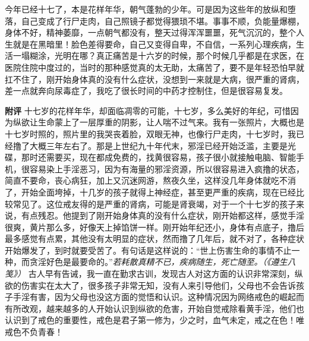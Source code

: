 \begin{case}
    今年已经十七了，本是花样年华，朝气蓬勃的少年。可是因为这些年的放纵和堕落，自己变成了行尸走肉，自己照镜子都觉得猥琐不堪。事事不顺，负能量爆棚，身体不好，精神萎靡，一点朝气都没有，整天过得浑浑噩噩，死气沉沉的，整个人生就是在黑暗里！脸色差得要命，自己又变得自卑，不自信，一系列心理疾病，生活一塌糊涂，光明在哪？真正痛苦是十六岁的时候，那个时候几乎都是在求医，在医院住院中度过的，当时的那种感觉真的太无助，太痛苦了，要不是年轻恐怕早就扛不住了，刚开始身体真的没有什么症状，没想到一来就是大病，很严重的肾病，差一点就奔向尿毒症了，我吃了很长时间的中药才控制住，但是很容易复发。

    \textbf{附评} 十七岁的花样年华，却面临凋零的可能，十七岁，多么美好的年纪，可惜因为纵欲让生命蒙上了一层厚重的阴影，让人喘不过气来。我有一张照片，大概也是十七岁时照的，照片里的我哭丧着脸，双眼无神，也像行尸走肉，十七岁时，我已经撸了大概三年左右了。那是上世纪九十年代末，邪淫已经开始泛滥，主要是光碟，那时还需要买，现在都成免费的，找黄很容易，孩子很小就接触电脑、智能手机，很容易染上手淫恶习，因为有海量的邪淫资源，所以很容易进入疯撸的状态，简直不要命，丧心病狂，加上又沉迷网游，熬夜久坐，这样没几年身体就吃不消了，开始全面垮掉，十几岁的孩子就得上神经症，甚至更严重的疾病，现在已经比较常见了。这位戒友得的是严重的肾病，可能是肾衰竭，对于一个十七岁的孩子来说，有点残忍。他提到了刚开始身体真的没有什么症状，刚开始都这样，感觉手淫很爽，黄片那么多，好像天上掉馅饼一样。刚开始年纪还小，身体有点底子，撸后最多感觉有点累，其他没有太明显的症状，然而撸了几年后，就不对了，各种症状开始爆发了，到时就要受苦了。有句话是这样说的：“世上伤害生命的事情不止一种，而贪淫好色是最要命的。”\textit{若耗散真精不已，疾病随生，死亡随至。（《遵生八笺》）} 古人早有告诫，我一直在勤求古训，发现古人对这方面的认识非常深刻，纵欲的伤害实在太大了，很多孩子非常无知，没有人来引导他们，父母也不会告诉孩子手淫有害，因为父母也没这方面的觉悟和认识。这种情况因为网络戒色的崛起而有所改观，越来越多的人开始认识到纵欲的危害，开始自觉戒除看黄手淫，他们也认识到了戒色的重要性，戒色是君子第一修为，少之时，血气未定，戒之在色！唯戒色不负青春！
\end{case}

